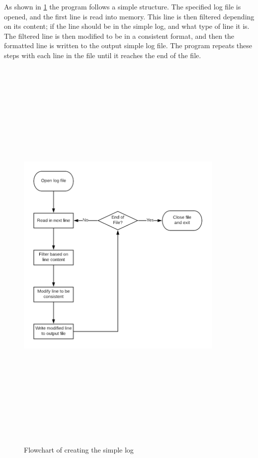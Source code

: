 As shown in \figurename{ \ref{fig:chapter5SimpleFlowchart}} the program follows a simple structure.
The specified log file is opened, and the first line is read into memory.
This line is then filtered depending on its content; if the line should be in the simple log, and what type of line it is. 
The filtered line is then modified to be in a consistent format, and then the formatted line is written to the output simple log file.
The program repeats these steps with each line in the file until it reaches the end of the file.

\begin{figure}
    \begin{centering}
        \includegraphics[width=10cm,height=20cm,keepaspectratio]{Figures/Chapter5-SimpleLogFlowchart.png}
        \caption{Flowchart of creating the simple log}
        \label{fig:chapter5SimpleFlowchart}
    \end{centering}
\end{figure}

